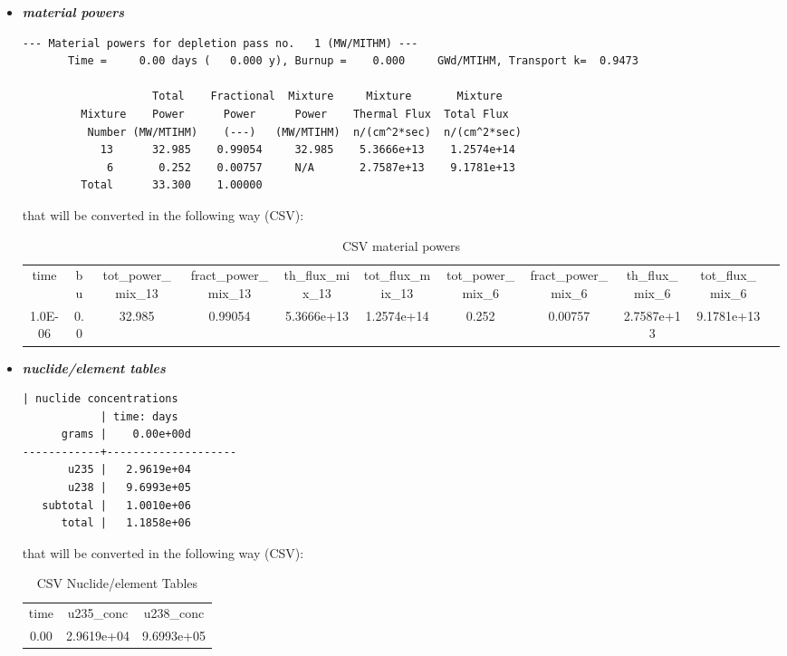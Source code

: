 \begin{itemize}
  \item \textit{\textbf{material powers}}
  \begin{lstlisting}[basicstyle=\tiny]
  --- Material powers for depletion pass no.   1 (MW/MITHM) ---
       Time =     0.00 days (   0.000 y), Burnup =    0.000     GWd/MTIHM, Transport k=  0.9473

                    Total    Fractional  Mixture     Mixture       Mixture
         Mixture    Power      Power      Power    Thermal Flux  Total Flux
          Number (MW/MTIHM)    (---)   (MW/MTIHM)  n/(cm^2*sec)  n/(cm^2*sec)
            13      32.985    0.99054     32.985    5.3666e+13    1.2574e+14
             6       0.252    0.00757     N/A       2.7587e+13    9.1781e+13
         Total      33.300    1.00000
\end{lstlisting}
   that will be converted in the following way (CSV):
   \begin{table}[h]
     \centering
     \caption{CSV material powers}
     \label{CSVmatPowers}
     \tabcolsep=0.11cm
     \tiny
     \begin{tabular}{|c|c|c|c|c|c|c|c|c|c|l}
     \cline{1-10}
     time    & bu  & tot\_power\_mix\_13 & fract\_power\_mix\_13 & th\_flux\_mix\_13 & tot\_flux\_mix\_13 & tot\_power\_mix\_6 & fract\_power\_mix\_6 & th\_flux\_mix\_6 & tot\_flux\_mix\_6 &  \\ \cline{1-10}
     1.0E-06 & 0.0 & 32.985              & 0.99054               & 5.3666e+13        & 1.2574e+14         & 0.252              & 0.00757              & 2.7587e+13       & 9.1781e+13        &  \\ \cline{1-10}
     \end{tabular}
   \end{table}


 \item \textit{\textbf{nuclide/element tables}}
  \begin{lstlisting}[basicstyle=\tiny]
            | nuclide concentrations
            | time: days
      grams |    0.00e+00d
------------+--------------------
       u235 |   2.9619e+04
       u238 |   9.6993e+05
   subtotal |   1.0010e+06
      total |   1.1858e+06
\end{lstlisting}
   that will be converted in the following way (CSV):
   \begin{table}[h]
    \centering
    \caption{CSV Nuclide/element Tables}
    \label{CSVnuclideTables}
    \tabcolsep=0.11cm
    \tiny
    \begin{tabular}{|c|c|c|}
     time & u235\_conc       & u238\_conc   \\
     0.00 & 2.9619e+04  & 9.6993e+05
    \end{tabular}
   \end{table}
\end{itemize}
